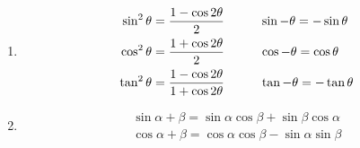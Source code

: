 \documentclass[10pt]{article}
\begin{document}
\begin{multicols}{2}
\begin{enumerate}
\begin{enumerate}
        
        \item     
        \begin{align*}
            \sin^2{\theta} = \frac{1-\cos{2\theta}}{2} & \hspace{10mm} \sin{-\theta} = -\sin{\theta} \\
            \cos^2{\theta} = \frac{1 + \cos{2\theta}}{2} & \hspace{10mm} \cos{-\theta} = \cos{\theta} \\
            \tan^2{\theta} = \frac{1-\cos{2\theta}}{1+\cos{2\theta}} & \hspace{10mm} \tan{-\theta} = -\tan{\theta} 
        \end{align*}

        \item 
        \begin{align*}
            \sin{\alpha + \beta} = \sin{\alpha}\cos{\beta} + \sin{\beta}\cos{\alpha} \\
            \cos{\alpha + \beta} = \cos{\alpha}\cos{\beta} - \sin{\alpha}\sin{\beta} 
        \end{align*}
    \end{enumerate}
    

\end{enumerate}
\end{multicols}
\end{document}
